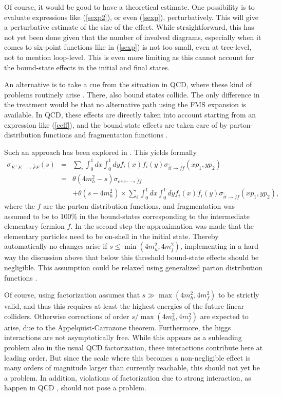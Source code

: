 \documentclass[final,12pt,3p,longtitle]{elsarticle}
\newcommand*{\no}{\noindent}
\newcommand*{\bea}{\begin{eqnarray}}
\newcommand*{\eea}{\end{eqnarray}}
\newcommand*{\pref}[1]{(\ref{#1})}
\newcommand*{\nn}{\nonumber}
\newcommand*{\1}{1\!\!\!\bot}
\begin{document}
Of course, it would be good to have a theoretical estimate. One possibility is to evaluate expressions like \pref{sexp2}, or even \pref{sexp}, perturbatively. This will give a perturbative estimate of the size of the effect. While straightforward, this has not yet been done given that the number of involved diagrams, especially when it comes to six-point functions like in \pref{sexp} is not too small, even at tree-level, not to mention loop-level. This is even more limiting as this cannot account for the bound-state effects in the initial and final states.

An alternative is to take a cue from the situation in QCD, where these kind of problems routinely arise \cite{BeiglboCk:2006lfa,Bohm:2001yx,Dissertori:2003pj,Brodsky:2010an}. There, also bound states collide. The only difference in the treatment would be that no alternative path using the FMS expansion is available. In QCD, these effects are directly taken into account starting from an expression like \pref{eeff}, and the bound-state effects are taken care of by parton-distribution functions and fragmentation functions \cite{BeiglboCk:2006lfa,Bohm:2001yx,Dissertori:2003pj}.

Such an approach has been explored in \cite{Egger:2017tkd}. This yields formally
\bea
\sigma_{E^+E^-\to\bar{F}F}(s)&=&\sum_i\int_0^1 dx\int_0^1 dy f_i(x) f_i(y)\sigma_{\bar{i}i\to\bar{f}f}(xp_1,yp_2)\label{pdf}\\
&=&\theta(4m_h^2-s)\sigma_{e^+e^-\to\bar{f}f}\nn\\
&&+\theta(s-4m_h^2)\times\sum_i\int_0^1 dx\int_0^1 dy f_i(x) f_i(y)\sigma_{\bar{i}i\to\bar{f}f}(xp_1,yp_2)\nn,
\eea
\no where the $f$ are the parton distribution functions, and fragmentation was assumed to be to 100\% in the bound-states corresponding to the intermediate elementary fermion $f$. In the second step the approximation was made that the elementary particles need to be on-shell in the initial state. Thereby automatically no changes arise if $s\le\min(4m_h^2,4m_f^2)$, implementing in a hard way the discussion above that below this threshold bound-state effects should be negligible. This assumption could be relaxed using generalized parton distribution functions \cite{Lorce:2013pza,Diehl:2015uka}.

Of course, using factorization assumes that $s\gg\max(4m_h^2,4m_f^2)$ to be strictly valid, and thus this requires at least the highest energies of the future linear colliders. Otherwise corrections of order $s/\max(4m_h^2,4m_f^2)$ are expected to arise, due to the Appelquist-Carrazone theorem. Furthermore, the higgs interactions are not asymptotically free. While this appears as a subleading problem also in the usual QCD factorization, these interactions contribute here at leading order. But since the scale where this becomes a non-negligible effect is many orders of magnitude larger than currently reachable, this should not yet be a problem. In addition, violations of factorization due to strong interaction, as happen in QCD \cite{Brodsky:2010an}, should not pose a problem.
\end{document}
